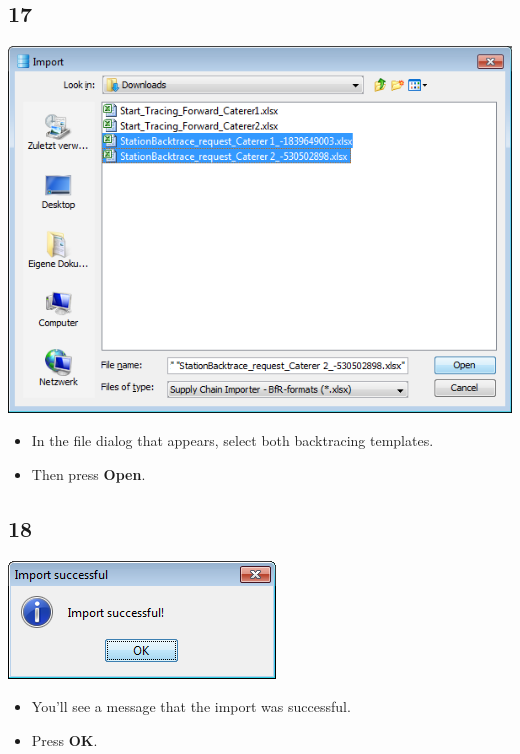 \documentclass{beamer}
\begin{document}
\subsection{17}
\begin{frame}
	\begin{center}
  		\includegraphics[height=0.6\textheight]{17.png}
	\end{center}
	\begin{itemize}
		\item In the file dialog that appears, select both backtracing templates.
		\item Then press \textbf{Open}.
	\end{itemize}
\end{frame}

\subsection{18}
\begin{frame}
	\begin{center}
  		\includegraphics[height=0.2\textheight]{18.png}
	\end{center}
	\begin{itemize}
		\item You'll see a message that the import was successful.
		\item Press \textbf{OK}.
	\end{itemize}
\end{frame}
\end{document}
